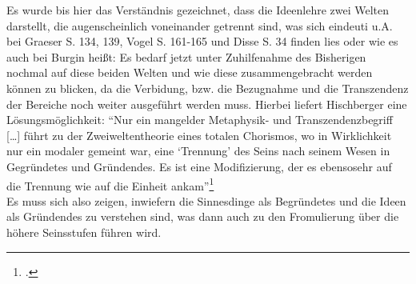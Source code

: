 Es wurde bis hier das Verständnis gezeichnet, dass die Ideenlehre zwei Welten darstellt, die augenscheinlich voneinander getrennt sind, was sich eindeuti u.A. bei Graeser S. 134, 139, Vogel S. 161-165 und Disse S. 34 finden lies oder wie es auch bei Burgin heißt: 
Es bedarf jetzt unter Zuhilfenahme des Bisherigen nochmal auf diese beiden Welten und wie diese zusammengebracht werden können zu blicken, da die Verbidung, bzw. die Bezugnahme und die Transzendenz der Bereiche noch weiter ausgeführt werden muss.
Hierbei liefert Hischberger eine Lösungsmöglichkeit:
\enquote{Nur ein mangelder Metaphysik- und Transzendenzbegriff [\dots] führt zu der Zweiweltentheorie eines totalen Chorismos, wo in Wirklichkeit nur ein modaler gemeint war, eine \enquote{Trennung} des Seins nach seinem Wesen in Gegründetes und Gründendes. Es ist eine Modifizierung, der es ebensosehr auf die Trennung wie auf die Einheit ankam}\footcite[][S. 96]{Hirschberger}\\
Es muss sich also zeigen, inwiefern die Sinnesdinge als Begründetes und die Ideen als Gründendes zu verstehen sind, was dann auch zu den Fromulierung über die höhere Seinsstufen führen wird.
